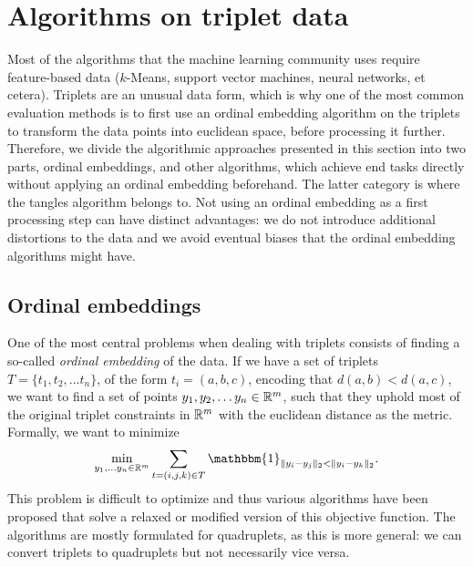 \section{Algorithms on triplet data}
Most of the algorithms that the machine learning community uses require feature-based data 
($k$-Means, support vector machines, neural networks, et cetera).
Triplets are an unusual data form, which is why one of the most common evaluation
methods is to first use an ordinal embedding algorithm on the triplets to transform
the data points into euclidean space, before processing it further.  
Therefore, we divide the algorithmic approaches presented in this section into two parts, 
ordinal embeddings, and other algorithms, which achieve
end tasks directly without applying an ordinal embedding beforehand. 
The latter category is where the tangles algorithm belongs to. Not using an ordinal embedding
as a first processing step can have distinct advantages: 
we do not introduce additional distortions to the data and we avoid eventual biases that the ordinal embedding algorithms might have.

\subsection{Ordinal embeddings}
One of the most central problems when dealing with triplets consists of finding a so-called \textit{ordinal embedding} of the data. If we have a set of triplets $T = \{t_1, t_2, \ldots t_n\}$, 
of the form $t_i = \left( a,b,c \right)$, encoding that $d(a,b) < d(a,c)$, 
we want to find a set of points $y_1, y_2, \ldots y_n \in \mathbb{R}^{m}$, such that they uphold most of the original triplet constraints in $\mathbb{R}^{m}$ with the euclidean distance
as the metric. Formally, we want to minimize \citep{vankadaraInsightsOrdinalEmbedding2021}
\begin{align}
    \min_{y_1, \ldots y_n \in \R^{m}} \sum_{t=\left( i,j,k \right)  \in T} \mathbbm{1}_{ \|y_i - y_j\|_2 < \|y_i - y_k\|_2 }
.\end{align}
This problem is difficult to optimize and thus various algorithms have been proposed that solve a relaxed or modified version of this objective function. The algorithms are mostly formulated
for quadruplets, as this is more general: we can convert triplets to quadruplets but not 
necessarily vice versa.

